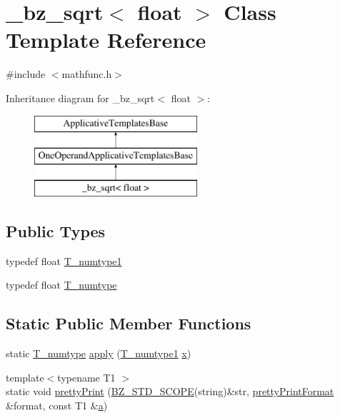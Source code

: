 \hypertarget{class__bz__sqrt_3_01float_01_4}{}\section{\+\_\+bz\+\_\+sqrt$<$ float $>$ Class Template Reference}
\label{class__bz__sqrt_3_01float_01_4}


{\ttfamily \#include $<$mathfunc.\+h$>$}

Inheritance diagram for \+\_\+bz\+\_\+sqrt$<$ float $>$\+:\begin{figure}[H]
\begin{center}
\leavevmode
\includegraphics[height=3.000000cm]{class__bz__sqrt_3_01float_01_4}
\end{center}
\end{figure}
\subsection*{Public Types}
\begin{DoxyCompactItemize}
\item 
typedef float \hyperlink{class__bz__sqrt_3_01float_01_4_a7bb6bfda2004449fd2997a6338167a95}{T\+\_\+numtype1}
\item 
typedef float \hyperlink{class__bz__sqrt_3_01float_01_4_abffbadf61e751c3fd07eaf345c77b5f1}{T\+\_\+numtype}
\end{DoxyCompactItemize}
\subsection*{Static Public Member Functions}
\begin{DoxyCompactItemize}
\item 
static \hyperlink{class__bz__sqrt_3_01float_01_4_abffbadf61e751c3fd07eaf345c77b5f1}{T\+\_\+numtype} \hyperlink{class__bz__sqrt_3_01float_01_4_ae1229bcd551e4fe799947014922c30fc}{apply} (\hyperlink{class__bz__sqrt_3_01float_01_4_a7bb6bfda2004449fd2997a6338167a95}{T\+\_\+numtype1} \hyperlink{vecnorm1_8cc_ac73eed9e41ec09d58f112f06c2d6cb63}{x})
\item 
{\footnotesize template$<$typename T1 $>$ }\\static void \hyperlink{class__bz__sqrt_3_01float_01_4_ae06a4bda0a6bc2491bd61ef0253c1ae3}{pretty\+Print} (\hyperlink{numinquire_8h_a2b24ffc3b4ef9803956bc7715c6c7b83}{B\+Z\+\_\+\+S\+T\+D\+\_\+\+S\+C\+O\+P\+E}(string)\&str, \hyperlink{classprettyPrintFormat}{pretty\+Print\+Format} \&format, const T1 \&\hyperlink{gen__mat5files_8m_aae328bf20413f220e38aec4d95bfd6da}{a})
\end{DoxyCompactItemize}


